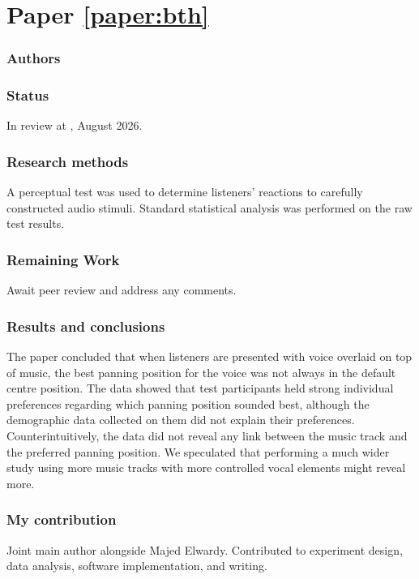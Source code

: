 \section*{Paper \ref{paper:bth}}
\textbf{}

\subsubsection*{Authors}

\subsubsection*{Status}
In review at , August 2026. 

\subsubsection*{Research methods}
A perceptual test was used to determine listeners' reactions to carefully constructed audio stimuli. Standard statistical analysis was performed on the raw test results.

\subsubsection*{Remaining Work}
Await peer review and address any comments.

\subsubsection*{Results and conclusions}
The paper concluded that when listeners are presented with voice overlaid on top of music, the best panning position for the voice was not always in the default centre position. The data showed that test participants held strong individual preferences regarding which panning position sounded best, although the demographic data collected on them did not explain their preferences. Counterintuitively, the data did not reveal any link between the music track and the preferred panning position. We speculated that performing a much wider study using more music tracks with more controlled vocal elements might reveal more.

\subsubsection*{My contribution}
Joint main author alongside Majed Elwardy. Contributed to experiment design, data analysis, software implementation, and writing.